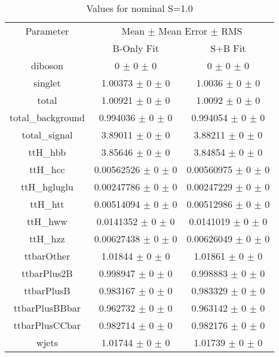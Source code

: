 \begin{table}
\centering
\caption{Values for nominal S=1.0}
\begin{tabular}{ccc}
\toprule
Parameter 	& \multicolumn{2}{c}{Mean $\pm$ Mean Error $\pm$ RMS}\\
 	& B-Only Fit & S+B Fit\\
\midrule
diboson 	& \num{0} $\pm$ \num{0} $\pm$ \num{0} 	& \num{0} $\pm$ \num{0} $\pm$ \num{0}\\
singlet 	& \num{1.00373} $\pm$ \num{0} $\pm$ \num{0} 	& \num{1.0036} $\pm$ \num{0} $\pm$ \num{0}\\
total 	& \num{1.00921} $\pm$ \num{0} $\pm$ \num{0} 	& \num{1.0092} $\pm$ \num{0} $\pm$ \num{0}\\
total\_background 	& \num{0.994036} $\pm$ \num{0} $\pm$ \num{0} 	& \num{0.994054} $\pm$ \num{0} $\pm$ \num{0}\\
total\_signal 	& \num{3.89011} $\pm$ \num{0} $\pm$ \num{0} 	& \num{3.88211} $\pm$ \num{0} $\pm$ \num{0}\\
ttH\_hbb 	& \num{3.85646} $\pm$ \num{0} $\pm$ \num{0} 	& \num{3.84854} $\pm$ \num{0} $\pm$ \num{0}\\
ttH\_hcc 	& \num{0.00562526} $\pm$ \num{0} $\pm$ \num{0} 	& \num{0.00560975} $\pm$ \num{0} $\pm$ \num{0}\\
ttH\_hgluglu 	& \num{0.00247786} $\pm$ \num{0} $\pm$ \num{0} 	& \num{0.00247229} $\pm$ \num{0} $\pm$ \num{0}\\
ttH\_htt 	& \num{0.00514094} $\pm$ \num{0} $\pm$ \num{0} 	& \num{0.00512986} $\pm$ \num{0} $\pm$ \num{0}\\
ttH\_hww 	& \num{0.0141352} $\pm$ \num{0} $\pm$ \num{0} 	& \num{0.0141019} $\pm$ \num{0} $\pm$ \num{0}\\
ttH\_hzz 	& \num{0.00627438} $\pm$ \num{0} $\pm$ \num{0} 	& \num{0.00626049} $\pm$ \num{0} $\pm$ \num{0}\\
ttbarOther 	& \num{1.01844} $\pm$ \num{0} $\pm$ \num{0} 	& \num{1.01861} $\pm$ \num{0} $\pm$ \num{0}\\
ttbarPlus2B 	& \num{0.998947} $\pm$ \num{0} $\pm$ \num{0} 	& \num{0.998883} $\pm$ \num{0} $\pm$ \num{0}\\
ttbarPlusB 	& \num{0.983167} $\pm$ \num{0} $\pm$ \num{0} 	& \num{0.983329} $\pm$ \num{0} $\pm$ \num{0}\\
ttbarPlusBBbar 	& \num{0.962732} $\pm$ \num{0} $\pm$ \num{0} 	& \num{0.963142} $\pm$ \num{0} $\pm$ \num{0}\\
ttbarPlusCCbar 	& \num{0.982714} $\pm$ \num{0} $\pm$ \num{0} 	& \num{0.982176} $\pm$ \num{0} $\pm$ \num{0}\\
wjets 	& \num{1.01744} $\pm$ \num{0} $\pm$ \num{0} 	& \num{1.01739} $\pm$ \num{0} $\pm$ \num{0}\\
\bottomrule
\end{tabular}
\end{table}